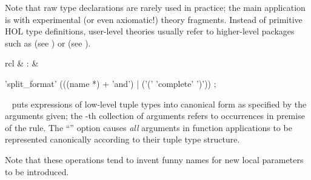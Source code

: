 \begin{isabellebody}
\begin{isamarkuptext}
  Note that raw type declarations are rarely used in practice; the
  main application is with experimental (or even axiomatic!) theory
  fragments.  Instead of primitive HOL type definitions, user-level
  theories usually refer to higher-level packages such as \hyperlink{command.HOL.record}{\mbox{}} (see ) or \hyperlink{command.HOL.datatype}{\mbox{}} (see ).%
\end{isamarkuptext}%
\isamarkuptrue%
%
\isamarkuptrue%
%
\begin{isamarkuptext}%
\begin{matharray}{rcl}
    \hyperlink{attribute.HOL.split-format}{\mbox{}}\isa{{\isachardoublequote}\isactrlsup {\isacharasterisk}{\isachardoublequote}} & : &  \\
  \end{matharray}

  \begin{rail}
    'split\_format' (((name *) + 'and') | ('(' 'complete' ')'))
    ;
  \end{rail}

  \begin{description}
  
  \item \hyperlink{attribute.HOL.split-format}{\mbox{}}~ puts expressions of low-level tuple types into
  canonical form as specified by the arguments given; the -th
  collection of arguments refers to occurrences in premise 
  of the rule.  The ``'' option causes \emph{all}
  arguments in function applications to be represented canonically
  according to their tuple type structure.

  Note that these operations tend to invent funny names for new local
  parameters to be introduced.


\end{description}
\end{isamarkuptext}
\end{isabellebody}
